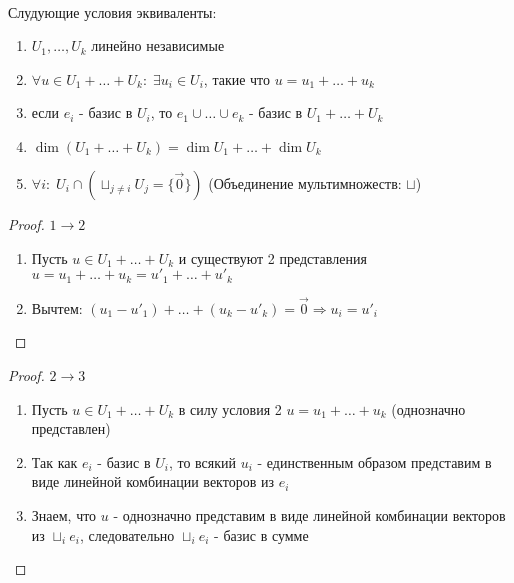 \bigskip


\begin{theorem}~
    
    Слудующие условия эквиваленты:

    \begin{enumerate}
        \item $U_1, \dots, U_k$ линейно независимые
        \item $\forall u \in U_1 + \dots + U_k: \; \exists u_i \in U_i$, такие что $u = u_1 + \dots + u_k$
        \item если $e_i$ - базис в $U_i$, то $e_1 \cup \dots \cup e_k$ - базис в $U_1 + \dots + U_k$
        \item $\dim(U_1 + \dots + U_k) = \dim U_1 + \dots + \dim U_k$
        \item $\forall i: \; U_i \cap (\sqcup_{j \not= i}U_{j} = \{\vec{0}\})$ (Объединение мультимножеств: $\sqcup$)
    \end{enumerate}

    \begin{proof} $1 \rightarrow 2$

        \begin{enumerate}
            \item Пусть $u \in U_1 + \dots + U_k$ и существуют 2 представления $u = u_1 + \dots + u_k = u'_1 + \dots + u'_k$
            \item Вычтем: $(u_1 - u'_1) + \dots + (u_k - u'_k) = \vec{0} \Rightarrow u_i = u'_i$
        \end{enumerate}
        
    \end{proof}

    \begin{proof} $2 \rightarrow 3$

        \begin{enumerate}
            \item Пусть $u \in U_1 + \dots + U_k$ в силу условия 2 $u = u_1 + \dots + u_k$ (однозначно представлен)
            \item Так как $e_i$ - базис в $U_i$, то всякий $u_i$ - единственным образом представим в виде линейной комбинации векторов из $e_i$
            \item Знаем, что $u$ - однозначно представим в виде линейной комбинации векторов из $\sqcup_{i}e_i$, следовательно $\sqcup_{i}e_i$ - базис в сумме
        \end{enumerate}
        
    \end{proof}


\end{theorem}
